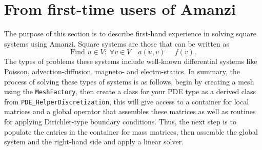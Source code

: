 
\section{From first-time users of Amanzi}
%
The purpose of this section is to describe first-hand experience in solving square 
systems using Amanzi. 
%
Square systems are those that can be written as
%
\begin{equation}
  \mbox{Find }u\in V:\;\forall v\in V\quad
  a(u,v) = f(v).
\end{equation}
%
The types of problems these systems include well-known differential systems like Poisson, advection-diffusion, 
magneto- and electro-statics.
% 
In summary, the process of solving these types of systems is as follows, begin by creating a mesh using the
{\tt MeshFactory}, then create a class for your PDE type as a derived class from {\tt PDE\_HelperDiscretization}, 
this will give access to a container for local matrices and a global operator that assembles these matrices as 
well as routines for applying Dirichlet-type boundary conditions.
% 
Thus, the next step is to populate the entries in the container for mass matrices, then assemble the global 
system and the right-hand side and apply a linear solver.
%
